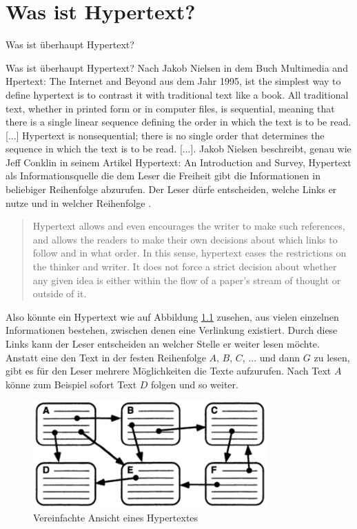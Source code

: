 \chapter{Was ist Hypertext?}
\label{ch:Was ist Hypertext?}

\begin{section}{Was ist überhaupt Hypertext?}
\label{sec:big_brother}

Was ist überhaupt Hypertext? Nach Jakob Nielsen in dem Buch Multimedia and Hpertext: The Internet and Beyond aus dem Jahr 1995, ist \glqq the simplest way to define hypertext is to contrast it with traditional text like a book. All traditional text, whether in printed form or in computer files, is sequential, meaning that there is a single linear sequence defining the order in which the text is to be read. [...] Hypertext is nonsequential; there is no single order that determines the sequence in which the text is to be read. [...]\grqq{ }\cite[S.1]{Nielsen1995}. Jakob Nielsen beschreibt, genau wie Jeff Conklin in seinem Artikel Hypertext: An Introduction and Survey, Hypertext als Informationsquelle die dem Leser die Freiheit gibt die Informationen in beliebiger Reihenfolge abzurufen. Der Leser dürfe entscheiden, welche Links er nutze und in welcher Reihenfolge \cite[S.33]{Conklin1987} \cite[S.1]{Nielsen1995}.

\begin{quote}
\glqq Hypertext allows and even encourages the writer to make such references, and allows the readers to make their own decisions about which links to follow and in what order. In this sense, hypertext eases the restrictions on the thinker and writer. It does not force a strict decision about whether any given idea is either within the flow of a paper's stream of thought or outside of it.\grqq{ }\cite[S.33]{Conklin1987}
\end{quote}

Also könnte ein Hypertext wie auf Abbildung \ref{fig:nielsenLink} zusehen, aus vielen einzelnen Informationen bestehen, zwischen denen eine Verlinkung existiert. Durch diese Links kann der Leser entscheiden an welcher Stelle er weiter lesen möchte. Anstatt eine den Text in der festen Reihenfolge $A$, $B$, $C$, $...$ und dann $G$ zu lesen, gibt es für den Leser mehrere Möglichkeiten die Texte aufzurufen. Nach Text $A$ könne zum Beispiel sofort Text $D$ folgen und so weiter\cite[S.1]{Nielsen1995}.

\begin{figure}[H]
	\centering
	\includegraphics[width=0.8\textwidth]{image/nielsenLink}
	\caption{Vereinfachte Ansicht eines Hypertextes \cite[S.1]{Nielsen1995}}
	\label{fig:nielsenLink}
\end{figure}



\end{section}
